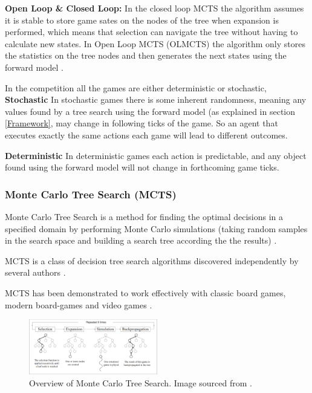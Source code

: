 \documentclass[journal]{IEEEtran}
\begin{document}
		\textbf{Open Loop \& Closed Loop:}
			In the closed loop MCTS the algorithm assumes it is stable to store game sates on the nodes of the tree when expansion is performed, which means that selection can navigate the tree without having to calculate new states.
			In Open Loop MCTS (OLMCTS) the algorithm only stores the statistics on the tree nodes and then generates the next states using the forward model \cite{perez2016analyzing, perez2015open}.
			
		
In the competition all the games are either deterministic or stochastic, 
	\textbf{Stochastic}
		In stochastic games there is some inherent randomness, meaning any values found by a  tree search using the forward model (as explained in section \ref{Framework}, may change in following ticks of the game. So an agent that executes exactly the same actions each game will lead to different outcomes.

	\textbf{Deterministic}
		In deterministic games each action is predictable, and any object found using the forward model will not change in forthcoming game ticks. 
		
		\subsubsection{Monte Carlo Tree Search (MCTS) }\label{sssec:MCTS}

		Monte Carlo Tree Search is a method for finding the optimal decisions in a specified domain by performing Monte Carlo simulations (taking random samples in the search space and building a search tree according the the results) \cite{browne2012survey}. 

		MCTS is a class of decision tree search algorithms discovered independently by several authors \cite{coulom2006efficient, kocsis2006bandit, chaslot2006monte}.
		
		MCTS has been demonstrated to work effectively with classic board games, modern board-games and video games \cite{chaslot2008monte, pepels2014real}.

		\begin{figure}[h]
		    \centering
		    \includegraphics[width=0.5\textwidth]{MCTSProcess}
		    \caption{Overview of Monte Carlo Tree Search. Image sourced from \cite{chaslot2008monte}. }
		    \label{fig:MCTS1}
		\end{figure}
		
\end{document}
